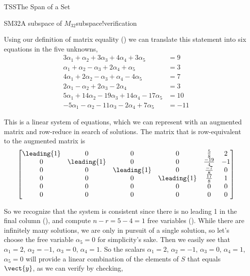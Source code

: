\begin{subsect}{TSS}{The Span of a Set}
\begin{example}{SM32}{A subspace of $M_{32}$}{subspace!verification}
\begin{para}
\end{para}
%
\begin{para}Using our definition of matrix equality () we can translate this statement into six equations in the five unknowns,
%
\begin{align*}
3\alpha_1 +\alpha_2 +3\alpha_3 +4\alpha_4 +3\alpha_5& =9\\
\alpha_1 +\alpha_2 -\alpha_3 +2\alpha_4 +\alpha_5& =3\\
4\alpha_1 +2\alpha_2 -\alpha_3 +\alpha_4 -4\alpha_5& =7\\
2\alpha_1 -\alpha_2 +2\alpha_3 -2\alpha_4 & =3\\
5\alpha_1 +14\alpha_2 -19\alpha_3 +14\alpha_4 -17\alpha_5& =10\\
-5\alpha_1 -\alpha_2 -11\alpha_3 -2\alpha_4 +7\alpha_5&=-11
\end{align*}
\end{para}
%
\begin{para}This is a linear system of equations, which we can represent with an augmented matrix and row-reduce in search of solutions.  The matrix that is row-equivalent to the augmented matrix is
%
\begin{equation*}
\begin{bmatrix}
\leading{1} & 0 & 0 & 0 & \frac{5}{8} & 2\\
0 & \leading{1} & 0 & 0 & \frac{-19}{4} & -1\\
0 & 0 & \leading{1} & 0 & \frac{-7}{8} & 0\\
0 & 0 & 0 & \leading{1} & \frac{17}{8} & 1\\
0 & 0 & 0 & 0 & 0 & 0\\
0 & 0 & 0 & 0 & 0 & 0
\end{bmatrix}
\end{equation*}
\end{para}
%
\begin{para}So we recognize that the system is consistent since there is no leading 1 in the final column (), and compute $n-r=5-4=1$ free variables ().  While there are infinitely many solutions, we are only in pursuit of a single solution, so let's choose the free variable $\alpha_5=0$ for simplicity's sake.  Then we easily see that $\alpha_1=2$, $\alpha_2=-1$, $\alpha_3=0$, $\alpha_4=1$.  So the scalars $\alpha_1=2$, $\alpha_2=-1$, $\alpha_3=0$, $\alpha_4=1$, $\alpha_5=0$ will provide a linear combination of the elements of $S$ that equals $\vect{y}$, as we can verify by checking,
%
\begin{align*}

\end{align*}
\end{para}
\end{example}
\end{subsect}
